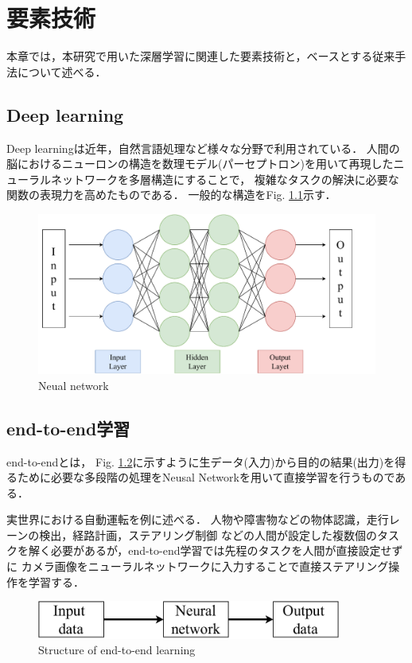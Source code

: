 \chapter{要素技術}
本章では，本研究で用いた深層学習に関連した要素技術と，ベースとする従来手法について述べる．

\section{Deep learning}
Deep learningは近年，自然言語処理など様々な分野で利用されている．
人間の脳におけるニューロンの構造を数理モデル(パーセプトロン)を用いて再現したニューラルネットワークを多層構造にすることで，
複雑なタスクの解決に必要な関数の表現力を高めたものである．
一般的な構造をFig. \ref{fig::network}示す．

\begin{figure}[h]
    \centering
    \includegraphics[width = 12cm]{./figs/net.pdf}
    \caption{Neual network}
    \label{fig::network}
\end{figure}

\section{end-to-end学習}
end-to-endとは，
Fig. \ref{fig::e2e}に示すように生データ(入力)から目的の結果(出力)を得るために必要な多段階の処理をNeusal Networkを用いて直接学習を行うものである．

実世界における自動運転を例に述べる．
人物や障害物などの物体認識，走行レーンの検出，経路計画，ステアリング制御
などの人間が設定した複数個のタスクを解く必要があるが，end-to-end学習では先程のタスクを人間が直接設定せずに
カメラ画像をニューラルネットワークに入力することで直接ステアリング操作を学習する．

\vspace{2.0zh}
\begin{figure}[h]
    \centering
    \includegraphics[width = 10cm]{./figs/e2e.pdf}
    \caption{Structure of end-to-end learning}
    \label{fig::e2e}
\end{figure}

